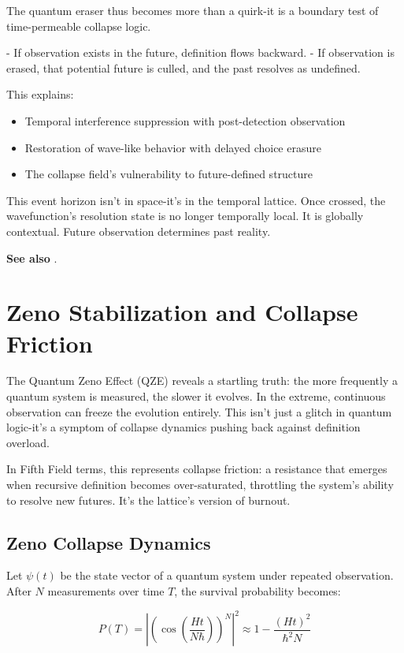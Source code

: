 The quantum eraser thus becomes more than a quirk-it is a boundary test of time-permeable collapse logic.

- If observation exists in the future, definition flows backward.
- If observation is erased, that potential future is culled, and the past resolves as undefined.

This explains:
\begin{itemize}
    \item Temporal interference suppression with post-detection observation
    \item Restoration of wave-like behavior with delayed choice erasure
    \item The collapse field’s vulnerability to future-defined structure
\end{itemize}

This event horizon isn't in space-it’s in the temporal lattice. Once crossed, the wavefunction’s resolution state is no longer temporally local. It is globally contextual. Future observation determines past reality.

\textbf{See also} \cite{chapter8_meta}.

\section{Zeno Stabilization and Collapse Friction}

The Quantum Zeno Effect (QZE) reveals a startling truth: the more frequently a quantum system is measured, the slower it evolves. In the extreme, continuous observation can freeze the evolution entirely. This isn't just a glitch in quantum logic-it's a symptom of collapse dynamics pushing back against definition overload.

In Fifth Field terms, this represents collapse friction: a resistance that emerges when recursive definition becomes over-saturated, throttling the system’s ability to resolve new futures. It’s the lattice’s version of burnout.

\subsection{Zeno Collapse Dynamics}

Let \( \psi(t) \) be the state vector of a quantum system under repeated observation. After \( N \) measurements over time \( T \), the survival probability becomes:

\[
P(T) = \left| \left( \cos\left( \frac{Ht}{N\hbar} \right) \right)^N \right|^2 \approx 1 - \frac{(Ht)^2}{\hbar^2 N}
\]

